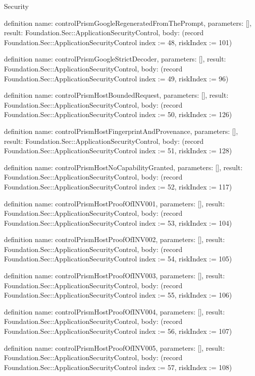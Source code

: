 \begin{lexlean}{Security}
\begin{semanticmodule}
definition{
  name: controlPrismGoogleRegeneratedFromThePrompt,
  parameters: [],
  result: Foundation.Sec::ApplicationSecurityControl,
  body: (record Foundation.Sec::ApplicationSecurityControl {index := 48, riskIndex := 101})
}

definition{
  name: controlPrismGoogleStrictDecoder,
  parameters: [],
  result: Foundation.Sec::ApplicationSecurityControl,
  body: (record Foundation.Sec::ApplicationSecurityControl {index := 49, riskIndex := 96})
}

definition{
  name: controlPrismHostBoundedRequest,
  parameters: [],
  result: Foundation.Sec::ApplicationSecurityControl,
  body: (record Foundation.Sec::ApplicationSecurityControl {index := 50, riskIndex := 126})
}

definition{
  name: controlPrismHostFingerprintAndProvenance,
  parameters: [],
  result: Foundation.Sec::ApplicationSecurityControl,
  body: (record Foundation.Sec::ApplicationSecurityControl {index := 51, riskIndex := 128})
}

definition{
  name: controlPrismHostNoCapabilityGranted,
  parameters: [],
  result: Foundation.Sec::ApplicationSecurityControl,
  body: (record Foundation.Sec::ApplicationSecurityControl {index := 52, riskIndex := 117})
}

definition{
  name: controlPrismHostProofOfINV001,
  parameters: [],
  result: Foundation.Sec::ApplicationSecurityControl,
  body: (record Foundation.Sec::ApplicationSecurityControl {index := 53, riskIndex := 104})
}

definition{
  name: controlPrismHostProofOfINV002,
  parameters: [],
  result: Foundation.Sec::ApplicationSecurityControl,
  body: (record Foundation.Sec::ApplicationSecurityControl {index := 54, riskIndex := 105})
}

definition{
  name: controlPrismHostProofOfINV003,
  parameters: [],
  result: Foundation.Sec::ApplicationSecurityControl,
  body: (record Foundation.Sec::ApplicationSecurityControl {index := 55, riskIndex := 106})
}

definition{
  name: controlPrismHostProofOfINV004,
  parameters: [],
  result: Foundation.Sec::ApplicationSecurityControl,
  body: (record Foundation.Sec::ApplicationSecurityControl {index := 56, riskIndex := 107})
}

definition{
  name: controlPrismHostProofOfINV005,
  parameters: [],
  result: Foundation.Sec::ApplicationSecurityControl,
  body: (record Foundation.Sec::ApplicationSecurityControl {index := 57, riskIndex := 108})
}


\end{semanticmodule}
\end{lexlean}
